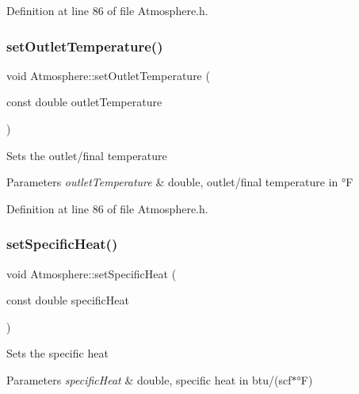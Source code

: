 Definition at line 86 of file Atmosphere.\+h.

\mbox{\label{class_atmosphere_a8f6589ab4e17d3c531bb7e0e771f4f80}} 
\subsubsection{\texorpdfstring{set\+Outlet\+Temperature()}{setOutletTemperature()}\hspace{0.1cm}{\footnotesize\ttfamily [3/3]}}
{\footnotesize\ttfamily void Atmosphere\+::set\+Outlet\+Temperature (\begin{DoxyParamCaption}\item[{const double}]{outlet\+Temperature }\end{DoxyParamCaption})\hspace{0.3cm}{\ttfamily [inline]}}

Sets the outlet/final temperature 
\begin{DoxyParams}{Parameters}
{\em outlet\+Temperature} & double, outlet/final temperature in °F \\
\hline
\end{DoxyParams}


Definition at line 86 of file Atmosphere.\+h.

\mbox{\label{class_atmosphere_a17450de3bc7a64b2736b1fe8785410cd}} 
\subsubsection{\texorpdfstring{set\+Specific\+Heat()}{setSpecificHeat()}\hspace{0.1cm}{\footnotesize\ttfamily [1/3]}}
{\footnotesize\ttfamily void Atmosphere\+::set\+Specific\+Heat (\begin{DoxyParamCaption}\item[{const double}]{specific\+Heat }\end{DoxyParamCaption})\hspace{0.3cm}{\ttfamily [inline]}}

Sets the specific heat 
\begin{DoxyParams}{Parameters}
{\em specific\+Heat} & double, specific heat in btu/(scf$\ast$°F) \\
\hline
\end{DoxyParams}


